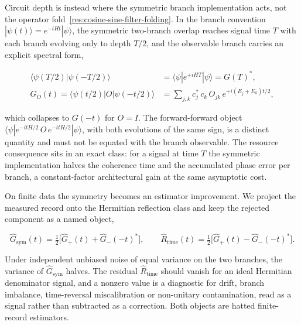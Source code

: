 Circuit depth is instead where the symmetric branch implementation acts, not the operator fold~\eqref{res:cosine-sine-filter-folding}. In the branch convention $|\psi(t)\rangle = e^{-iHt}|\psi\rangle$, the symmetric two-branch overlap reaches signal time $T$ with each branch evolving only to depth $T/2$, and the observable branch carries an explicit spectral form,
\begin{widetext}
\begin{equation}\label{res:half-depth-symmetric-branches}
\begin{aligned}
\langle\psi(T/2)|\psi(-T/2)\rangle &= \langle\psi|e^{+iHT}|\psi\rangle = G(T)^* ,\\
G_O(t) = \langle\psi(t/2)|O|\psi(-t/2)\rangle &= \sum_{j,k} c_j^*\,c_k\,O_{jk}\,e^{+i(E_j+E_k)t/2} ,
\end{aligned}
\end{equation}
\end{widetext}
which collapses to $G(-t)$ for $O = I$. The forward-forward object $\langle\psi|e^{-itH/2}\,O\,e^{-itH/2}|\psi\rangle$, with both evolutions of the same sign, is a distinct quantity and must not be equated with the branch observable. The resource consequence sits in an exact class: for a signal at time $T$ the symmetric implementation halves the coherence time and the accumulated phase error per branch, a constant-factor architectural gain at the same asymptotic cost.

On finite data the symmetry becomes an estimator improvement. We project the measured record onto the Hermitian reflection class and keep the rejected component as a named object,
\begin{widetext}
\begin{equation}\label{def:symmetric-record-projection}
\widehat G_{\mathrm{sym}}(t) = \tfrac{1}{2}\big[\widehat G_+(t) + \widehat G_-(-t)^*\big],
\qquad
\widehat R_{\mathrm{time}}(t) = \tfrac{1}{2}\big[\widehat G_+(t) - \widehat G_-(-t)^*\big].
\end{equation}
\end{widetext}
Under independent unbiased noise of equal variance on the two branches, the variance of $\widehat G_{\mathrm{sym}}$ halves. The residual $\widehat R_{\mathrm{time}}$ should vanish for an ideal Hermitian denominator signal, and a nonzero value is a diagnostic for drift, branch imbalance, time-reversal miscalibration or non-unitary contamination, read as a signal rather than subtracted as a correction. Both objects are hatted finite-record estimators.

